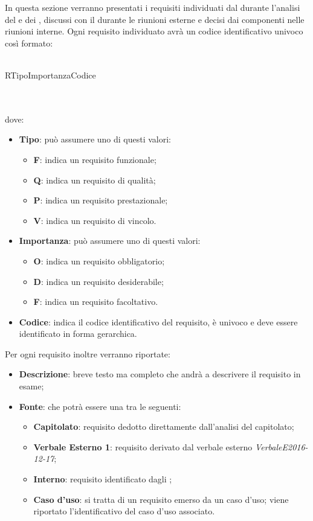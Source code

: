 \documentclass[AdR.tex]{subfiles}
\begin{document}
In questa sezione verranno presentati i requisiti individuati dal  durante l'analisi del 
e dei , discussi con il  durante le riunioni esterne e decisi dai componenti
nelle riunioni interne.
Ogni requisito individuato avrà un codice identificativo univoco così formato: \\ \\
\centerline{R\textbraceleft{}Tipo\textbraceright{}\textbraceleft{}Importanza\textbraceright{}\textbraceleft{}Codice\textbraceright{}}
 \\ \\
dove:
\begin{itemize}
 	\item \textbf{Tipo}: può assumere uno di questi valori:
 	\begin{itemize}
 		\item \textbf{F}: indica un requisito funzionale;
 		\item \textbf{Q}: indica un requisito di qualità;
 		\item \textbf{P}: indica un requisito prestazionale;
 		\item \textbf{V}: indica un requisito di vincolo.
 	\end{itemize}
 	\item \textbf{Importanza}: può assumere uno di questi valori:
 	\begin{itemize}
 		\item \textbf{O}: indica un requisito obbligatorio;
 		\item \textbf{D}: indica un requisito desiderabile;
 		\item \textbf{F}: indica un requisito facoltativo.
 	\end{itemize}
 	\item \textbf{Codice}: indica il codice identificativo del requisito, è univoco e deve essere identificato in forma gerarchica.
 \end{itemize}
Per ogni requisito inoltre verranno riportate:
\begin{itemize}
	\item \textbf{Descrizione}: breve testo ma completo che andrà a descrivere il requisito in esame;
	\item \textbf{Fonte}: che potrà essere una tra le seguenti:
	\begin{itemize}
		\item \textbf{Capitolato}: requisito dedotto direttamente dall'analisi del capitolato;
		\item \textbf{Verbale Esterno 1}: requisito derivato dal verbale esterno \textit{Verbale\textunderscore{}E\textunderscore{}2016-12-17};
		\item \textbf{Interno}: requisito identificato dagli \ANP;
		\item \textbf{Caso d'uso}: si tratta di un requisito emerso da un caso d'uso; viene riportato l'identificativo del caso d'uso associato.
	\end{itemize}
\end{itemize}
\end{document}
